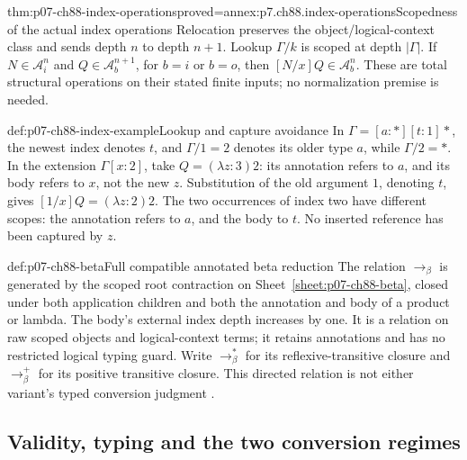 \begin{hblemma}{thm:p07-ch88-index-operations}{proved=annex:p7.ch88.index-operations}{Scopedness of the actual index operations}
Relocation preserves the object/logical-context class and sends depth
\(n\) to depth \(n+1\). Lookup \(\Gamma/k\) is scoped at depth
\(|\Gamma|\). If \(N\in\mathcal A_i^n\) and
\(Q\in\mathcal A_b^{n+1}\), for \(b=i\) or \(b=o\), then
\([N/x]Q\in\mathcal A_b^n\). These are total structural operations
on their stated finite inputs; no normalization premise is needed.
\end{hblemma}

\begin{hbexample}{def:p07-ch88-index-example}{Lookup and capture avoidance}
In \(\Gamma=[a:\ast][t:1]\ast\), the newest index denotes \(t\),
and \(\Gamma/1=2\) denotes its older type \(a\), while
\(\Gamma/2=\ast\). In the extension \(\Gamma[x:2]\), take
\(Q=(\lambda z:3)2\): its annotation refers to \(a\), and its
body refers to \(x\), not the new \(z\). Substitution of the old
argument \(1\), denoting \(t\), gives
\([1/x]Q=(\lambda z:2)2\). The two occurrences of index two have
different scopes: the annotation refers to \(a\), and the body to
\(t\). No inserted reference has been captured by \(z\).
\end{hbexample}

\begin{hbdefinition}{def:p07-ch88-beta}{Full compatible annotated beta reduction}
The relation \(\longrightarrow_\beta\) is generated by the scoped
root contraction on Sheet~\ref{sheet:p07-ch88-beta}, closed under
both application children and both the annotation and body of a
product or lambda. The body's external index depth increases by one.
It is a relation on raw scoped objects and logical-context terms;
it retains annotations and has no restricted logical typing guard.
Write \(\longrightarrow_\beta^*\) for its reflexive-transitive
closure and \(\longrightarrow_\beta^+\) for its positive transitive
closure. This directed relation is not either variant's typed
conversion judgment \cite[p.~102]{CoquandHuet1988}.
\end{hbdefinition}

\subsection{Validity, typing and the two conversion regimes}

